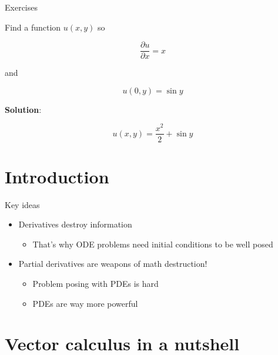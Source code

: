\documentclass{beamer}
\begin{document}
  \begin{frame}{Exercises}

    Find a function $u(x,y)$ so 

    \begin{displaymath}
    \frac{\partial u}{\partial x} =  x
    \end{displaymath}

    \pause

    and

    \begin{displaymath}
    u(0,y) = \sin y
    \end{displaymath}

    \pause

    \textbf{Solution}:

    \begin{displaymath}
    u(x,y) = \frac{x^2}{2} + \sin y
    \end{displaymath}

  \end{frame}

\section{Introduction}

  \begin{frame}{Key ideas}

    \begin{itemize}
    \item Derivatives destroy information
        \pause
        \begin{itemize}
        \item That's why ODE problems need initial conditions to be well posed
        \end{itemize}
    \pause
    \item Partial derivatives are weapons of math destruction!
        \pause
        \begin{itemize}
        \item Problem posing with PDEs is hard
        \item PDEs are way more powerful
        \end{itemize}
    \end{itemize}

  \end{frame}

\section{Vector calculus in a nutshell}
\end{document}
